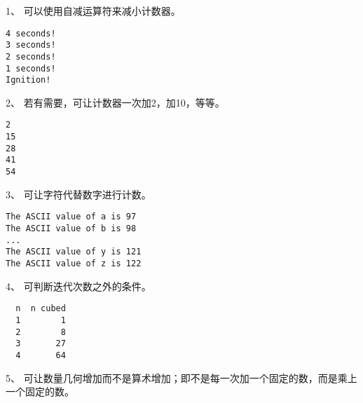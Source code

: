 \begin{frame}[fragile]
1、 可以使用自减运算符来减小计数器。

\end{frame}

\begin{frame}[fragile]
\begin{lstlisting}
4 seconds!
3 seconds!
2 seconds!
1 seconds!
Ignition!
\end{lstlisting}
\end{frame}

\begin{frame}[fragile]
2、 若有需要，可让计数器一次加2，加10，等等。

\end{frame}

\begin{frame}[fragile]

\begin{lstlisting}
2
15
28
41
54
\end{lstlisting}
\end{frame}

\begin{frame}[fragile]
3、 可让字符代替数字进行计数。

\end{frame}

\begin{frame}[fragile]
\begin{lstlisting}
The ASCII value of a is 97
The ASCII value of b is 98
... 
The ASCII value of y is 121
The ASCII value of z is 122
\end{lstlisting}
\end{frame}

\begin{frame}[fragile]
4、 可判断迭代次数之外的条件。

\end{frame}

\begin{frame}[fragile]
\begin{lstlisting}
  n  n cubed
  1        1
  2        8
  3       27
  4       64
\end{lstlisting}
\end{frame}

\begin{frame}[fragile]
5、 可让数量几何增加而不是算术增加；即不是每一次加一个固定的数，而是乘上一个固定的数。

\end{frame}

